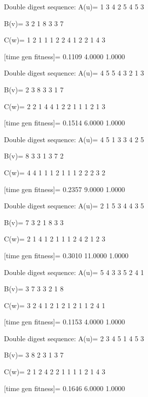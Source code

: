 Double digest sequence:
A(u)=
     1     3     4     2     5     4     5     3

B(v)=
     3     2     1     8     3     3     7

C(w)=
     1     2     1     1     1     2     2     4     1     2     2     1     4     3

[time gen fitness]=
    0.1109    4.0000    1.0000

Double digest sequence:
A(u)=
     4     5     5     4     3     2     1     3

B(v)=
     2     3     8     3     3     1     7

C(w)=
     2     2     1     4     4     1     2     2     1     1     1     2     1     3

[time gen fitness]=
    0.1514    6.0000    1.0000

Double digest sequence:
A(u)=
     4     5     1     3     3     4     2     5

B(v)=
     8     3     3     1     3     7     2

C(w)=
     4     4     1     1     1     2     1     1     1     2     2     2     3     2

[time gen fitness]=
    0.2357    9.0000    1.0000

Double digest sequence:
A(u)=
     2     1     5     3     4     4     3     5

B(v)=
     7     3     2     1     8     3     3

C(w)=
     2     1     4     1     2     1     1     1     2     4     2     1     2     3

[time gen fitness]=
    0.3010   11.0000    1.0000

Double digest sequence:
A(u)=
     5     4     3     3     5     2     4     1

B(v)=
     3     7     3     3     2     1     8

C(w)=
     3     2     4     1     2     1     2     1     2     1     1     2     4     1

[time gen fitness]=
    0.1153    4.0000    1.0000

Double digest sequence:
A(u)=
     2     3     4     5     1     4     5     3

B(v)=
     3     8     2     3     1     3     7

C(w)=
     2     1     2     4     2     2     1     1     1     1     2     1     4     3

[time gen fitness]=
    0.1646    6.0000    1.0000

